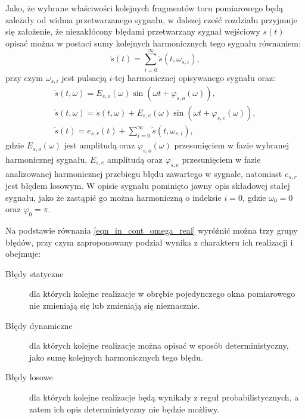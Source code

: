Jako, że wybrane właściwości kolejnych fragmentów toru pomiarowego będą zależały od widma przetwarzanego sygnału, w dalszej cześć rozdziału przyjmuje się założenie, że niezakłócony błędami przetwarzany sygnał wejściowy $s(t)$ opisać można w postaci sumy kolejnych harmonicznych tego sygnału równaniem:
\begin{equation}
\dot{s}(t) = \sum _{i = 0} ^{\infty} \dot{s}(t, \omega_{s,i}) \label{eqn_in_cont_sum},
\end{equation}
przy czym $\omega_{s,i}$ jest pulsacją $i$-tej harmonicznej opisywanego sygnału oraz:
\begin{gather}
\dot{s}(t, \omega) = E_{s,o}(\omega) \sin \left( \omega t + \varphi_{s,o}(\omega) \right) \label{eqn_in_cont_omega_ideal}, \\
\tilde{s}(t, \omega) = \dot{s}(t, \omega) + E_{s,e}(\omega) \sin \left( \omega t + \varphi_{s,e}(\omega) \right) \label{eqn_in_cont_omega_real}, \\
\tilde{s}(t) = e_{s,r}(t) + \sum _{i = 0} ^{\infty} \tilde{s}(t, \omega_{s,i}) \label{eqn_in_cont_sum_real},
\end{gather}
gdzie $E_{s,o}(\omega)$ jest amplitudą oraz $\varphi_{s,o}(\omega)$ przesunięciem w fazie wybranej harmonicznej sygnału, $E_{s,e}$ amplitudą oraz $ \varphi_{s,e}$ przesunięciem w fazie analizowanej harmonicznej przebiegu błędu zawartego w sygnale, natomiast $e_{s,r}$ jest błędem losowym. W opisie sygnału pominięto jawny opis składowej stałej sygnału, jako że zastąpić go można harmoniczną o indeksie $i = 0$, gdzie $\omega_{0} = 0$ oraz $\varphi_{0} = \pi$.

Na podstawie równania \eqref{eqn_in_cont_omega_real} wyróżnić można trzy grupy błędów, przy czym zaproponowany podział wynika z charakteru ich realizacji i obejmuje:
\begin{description}
\item [Błędy statyczne] dla których kolejne realizacje w obrębie pojedynczego okna pomiarowego nie zmieniają się lub zmieniają się nieznacznie.
\item [Błędy dynamiczne] dla których kolejne realizacje można opisać w sposób deterministyczny, jako sumę kolejnych harmonicznych tego błędu.
\item [Błędy losowe] dla których kolejne realizacje będą wynikały z reguł probabilistycznych, a zatem ich opis deterministyczny nie będzie możliwy.
\end{description}

